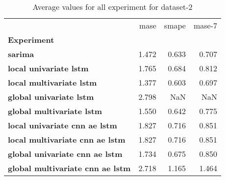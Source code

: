 \begin{table}[h]
\centering
\caption{Average values for all experiment for dataset-2}
\label{table:Average-metric-dataset-2}
\begin{tabular}{lrrr}
\toprule
{} &   mase &  smape &  mase-7 \\
\textbf{Experiment                     } &        &        &         \\
\midrule
\textbf{sarima                         } &  1.472 &  0.633 &   0.707 \\
\textbf{local univariate lstm          } &  1.765 &  0.684 &   0.812 \\
\textbf{local multivariate lstm        } &  1.377 &  0.603 &   0.697 \\
\textbf{global univariate lstm         } &  2.798 &    NaN &     NaN \\
\textbf{global multivariate lstm       } &  1.550 &  0.642 &   0.775 \\
\textbf{local univariate cnn ae lstm   } &  1.827 &  0.716 &   0.851 \\
\textbf{local multivariate cnn ae lstm } &  1.827 &  0.716 &   0.851 \\
\textbf{global univariate cnn ae lstm  } &  1.734 &  0.675 &   0.850 \\
\textbf{global multivariate cnn ae lstm} &  2.718 &  1.165 &   1.464 \\
\bottomrule
\end{tabular}
\end{table}

